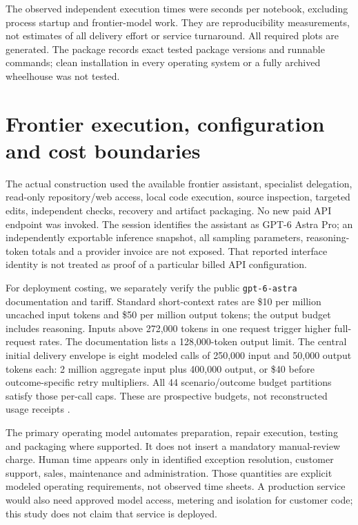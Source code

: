 The observed independent execution times were seconds per notebook, excluding process startup and frontier-model work. They are reproducibility measurements, not estimates of all delivery effort or service turnaround. All required plots are generated. The package records exact tested package versions and runnable commands; clean installation in every operating system or a fully archived wheelhouse was not tested.

\section{Frontier execution, configuration and cost boundaries}\label{sec:model}
The actual construction used the available frontier assistant, specialist delegation, read-only repository/web access, local code execution, source inspection, targeted edits, independent checks, recovery and artifact packaging. No new paid API endpoint was invoked. The session identifies the assistant as GPT-6 Astra Pro; an independently exportable inference snapshot, all sampling parameters, reasoning-token totals and a provider invoice are not exposed. That reported interface identity is not treated as proof of a particular billed API configuration.

For deployment costing, we separately verify the public \texttt{gpt-6-astra} documentation and tariff. Standard short-context rates are \$10 per million uncached input tokens and \$50 per million output tokens; the output budget includes reasoning. Inputs above 272,000 tokens in one request trigger higher full-request rates. The documentation lists a 128,000-token output limit. The central initial delivery envelope is eight modeled calls of 250,000 input and 50,000 output tokens each: 2 million aggregate input plus 400,000 output, or \$40 before outcome-specific retry multipliers. All 44 scenario/outcome budget partitions satisfy those per-call caps. These are prospective budgets, not reconstructed usage receipts \citep{astramodel,pricing}.

The primary operating model automates preparation, repair execution, testing and packaging where supported. It does not insert a mandatory manual-review charge. Human time appears only in identified exception resolution, customer support, sales, maintenance and administration. Those quantities are explicit modeled operating requirements, not observed time sheets. A production service would also need approved model access, metering and isolation for customer code; this study does not claim that service is deployed.

